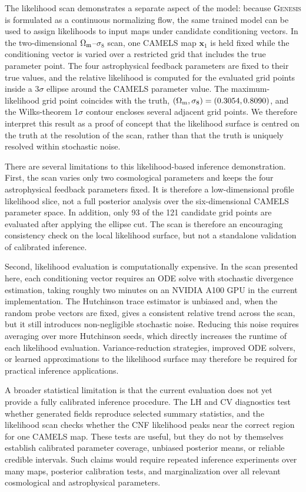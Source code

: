 \documentclass[usenatbib]{mnras}
\newcommand{\Om}{\Omega_{\rm m}}
\newcommand{\sig}{\sigma_8}
\begin{document}
The likelihood scan demonstrates a separate aspect of the model:
because \textsc{Genesis} is formulated as a continuous normalizing
flow, the same trained model can be used to assign likelihoods to
input maps under candidate conditioning vectors. In the
two-dimensional $\Om$--$\sig$ scan, one CAMELS map $\mathbf{x}_1$ is
held fixed while the conditioning vector is varied over a restricted
grid that includes the true parameter point. The four astrophysical
feedback parameters are fixed to their true values, and the relative
likelihood is computed for the evaluated grid points inside a
$3\sigma$ ellipse around the CAMELS parameter value. The
maximum-likelihood grid point coincides with the truth,
$(\Om,\sig)=(0.3054,0.8090)$, and the Wilks-theorem 1$\sigma$
contour encloses several adjacent grid points. We therefore interpret
this result as a proof of concept that the likelihood surface is
centred on the truth at the resolution of the scan, rather than that
the truth is uniquely resolved within stochastic noise.

There are several limitations to this likelihood-based inference
demonstration. First, the scan varies only two cosmological parameters
and keeps the four astrophysical feedback parameters fixed. It is
therefore a low-dimensional profile likelihood slice, not a full
posterior analysis over the six-dimensional CAMELS parameter space. In
addition, only 93 of the 121 candidate grid points are evaluated after
applying the ellipse cut. The scan is therefore an encouraging
consistency check on the local likelihood surface, but not a
standalone validation of calibrated inference.

Second, likelihood evaluation is computationally expensive. In the
scan presented here, each conditioning vector requires an ODE solve
with stochastic divergence estimation, taking roughly two minutes on
an NVIDIA A100 GPU in the current implementation. The Hutchinson trace
estimator is unbiased and, when the random probe vectors are fixed,
gives a consistent relative trend across the scan, but it still
introduces non-negligible stochastic noise. Reducing this noise
requires averaging over more Hutchinson seeds, which directly
increases the runtime of each likelihood evaluation. Variance-reduction
strategies, improved ODE solvers, or learned approximations to the
likelihood surface may therefore be required for practical inference
applications.

A broader statistical limitation is that the current evaluation does
not yet provide a fully calibrated inference procedure. The LH and CV
diagnostics test whether generated fields reproduce selected summary
statistics, and the likelihood scan checks whether the CNF likelihood
peaks near the correct region for one CAMELS map. These tests are
useful, but they do not by themselves establish calibrated parameter
coverage, unbiased posterior means, or reliable credible intervals.
Such claims would require repeated inference experiments over many
maps, posterior calibration tests, and marginalization over all relevant
cosmological and astrophysical parameters.
\end{document}
